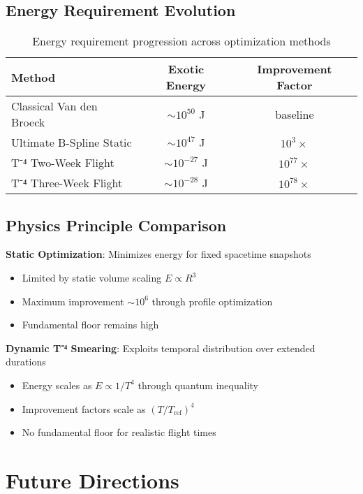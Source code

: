 \documentclass[12pt,a4paper]{article}
\begin{document}
\subsection{Energy Requirement Evolution}

\begin{table}[h]
\centering
\begin{tabular}{lcc}
\hline
Method & Exotic Energy & Improvement Factor \\
\hline
Classical Van den Broeck & $\sim 10^{50}$ J & baseline \\
Ultimate B-Spline Static & $\sim 10^{47}$ J & $10^3 \times$ \\
T⁻⁴ Two-Week Flight & $\sim 10^{-27}$ J & $10^{77} \times$ \\
T⁻⁴ Three-Week Flight & $\sim 10^{-28}$ J & $10^{78} \times$ \\
\hline
\end{tabular}
\caption{Energy requirement progression across optimization methods}
\end{table}

\subsection{Physics Principle Comparison}

\textbf{Static Optimization}: Minimizes energy for fixed spacetime snapshots
\begin{itemize}
\item Limited by static volume scaling $E \propto R^3$
\item Maximum improvement $\sim 10^6$ through profile optimization
\item Fundamental floor remains high
\end{itemize}

\textbf{Dynamic T⁻⁴ Smearing}: Exploits temporal distribution over extended durations
\begin{itemize}
\item Energy scales as $E \propto 1/T^4$ through quantum inequality
\item Improvement factors scale as $(T/T_{\text{ref}})^4$
\item No fundamental floor for realistic flight times
\end{itemize}

\section{Future Directions}
\end{document}
